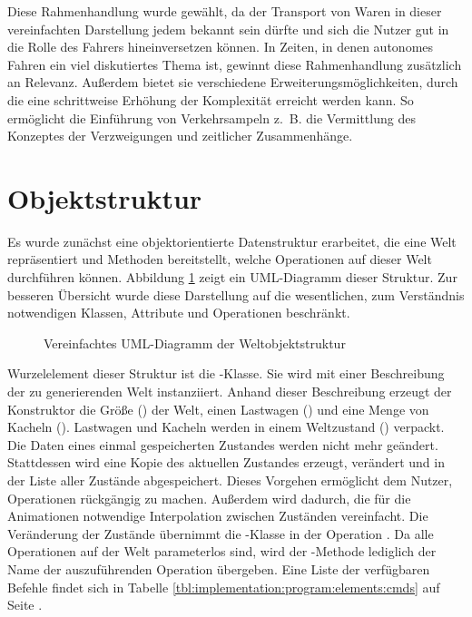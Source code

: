 Diese Rahmenhandlung wurde gewählt, da der Transport von Waren in dieser vereinfachten Darstellung jedem bekannt sein dürfte und sich die Nutzer gut in die Rolle des Fahrers hineinversetzen können. In Zeiten, in denen autonomes Fahren ein viel diskutiertes Thema ist, gewinnt diese Rahmenhandlung zusätzlich an Relevanz. Außerdem bietet sie verschiedene Erweiterungsmöglichkeiten, durch die eine schrittweise Erhöhung der Komplexität erreicht werden kann. So ermöglicht die Einführung von Verkehrsampeln z.~B. die Vermittlung des Konzeptes der Verzweigungen und zeitlicher Zusammenhänge.

\section{Objektstruktur}
\label{sec:implementation:structure}

Es wurde zunächst eine objektorientierte Datenstruktur erarbeitet, die eine Welt repräsentiert und Methoden bereitstellt, welche Operationen auf dieser Welt durchführen können. Abbildung \ref{fig:implementation:structure:uml} zeigt ein UML-Diagramm dieser Struktur. Zur besseren Übersicht wurde diese Darstellung auf die wesentlichen, zum Verständnis notwendigen Klassen, Attribute und Operationen beschränkt.

\begin{figure}
  
  \caption{Vereinfachtes UML-Diagramm der Weltobjektstruktur}
  \label{fig:implementation:structure:uml}
\end{figure}

Wurzelelement dieser Struktur ist die -Klasse. Sie wird mit einer Beschreibung der zu generierenden Welt instanziiert. Anhand dieser Beschreibung erzeugt der Konstruktor die Größe () der Welt, einen Lastwagen () und eine Menge von Kacheln (). Lastwagen und Kacheln werden in einem Weltzustand () verpackt. Die Daten eines einmal gespeicherten Zustandes werden nicht mehr geändert. Stattdessen wird eine Kopie des aktuellen Zustandes erzeugt, verändert und in der Liste aller Zustände abgespeichert. Dieses Vorgehen ermöglicht dem Nutzer, Operationen rückgängig zu machen. Außerdem wird dadurch, die für die Animationen  notwendige Interpolation zwischen Zuständen vereinfacht. Die Veränderung der Zustände übernimmt die -Klasse in der Operation . Da alle Operationen auf der Welt parameterlos sind, wird der -Methode lediglich der Name der auszuführenden Operation übergeben. Eine Liste der verfügbaren Befehle findet sich in Tabelle \ref{tbl:implementation:program:elements:cmds} auf Seite \pageref{tbl:implementation:program:elements:cmds}.

